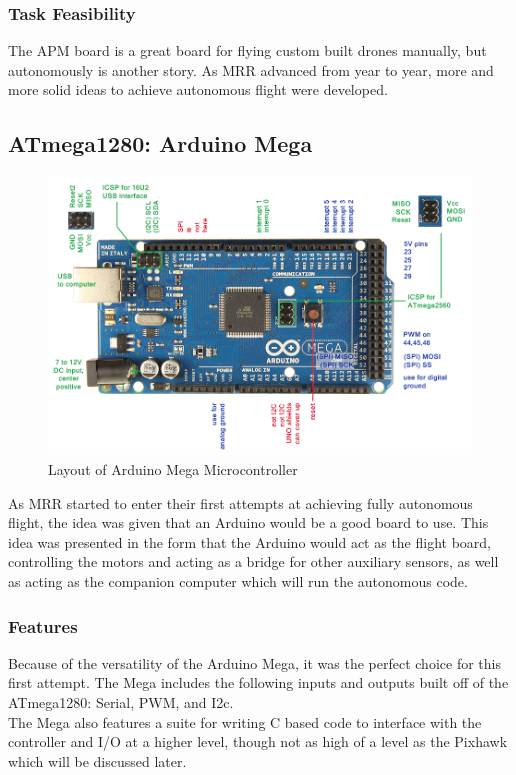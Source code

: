 \documentclass[conference,12pt, ]{IEEEtran}
\begin{document}
\subsubsection{Task Feasibility}
The APM board is a great board for flying custom built drones manually, but autonomously is another story. As MRR advanced from year to year, more and more solid ideas to achieve autonomous flight were developed.

\subsection{ATmega1280: Arduino Mega }
\begin{figure}
	\includegraphics[scale=0.25]{mega.png}
	\caption {Layout of Arduino Mega  Microcontroller}
\end{figure}
As MRR started to enter their first attempts at achieving fully autonomous flight, the idea was given that an Arduino would be a good board to use. This idea was presented in the form that the Arduino would act as the flight board, controlling the motors and acting as a bridge for other auxiliary sensors, as well as acting as the companion computer which will run the autonomous code. 
\subsubsection{Features}
Because of the versatility of the Arduino Mega, it was the perfect choice for this first attempt. The Mega includes the following inputs and outputs built off of the ATmega1280:  Serial, PWM, and I2c.\cite{arduino} \\
The Mega also features a suite for writing C based code to interface with the controller and I/O at a higher level, though not as high of a level as the Pixhawk which will be discussed later. 
\end{document}
